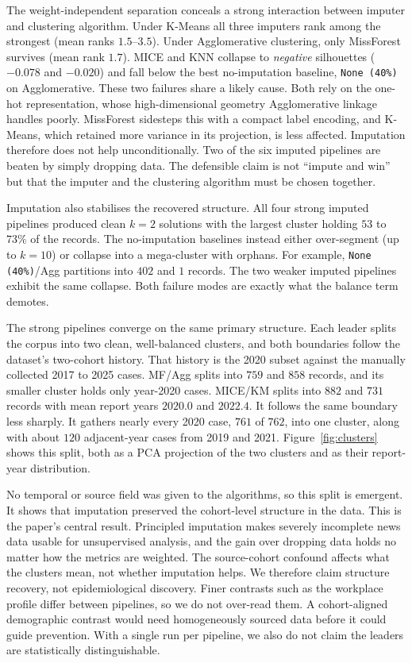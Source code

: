 \documentclass[conference]{IEEEtran}
\begin{document}
The weight-independent separation conceals a strong interaction between imputer and clustering algorithm. Under K-Means all three imputers rank among the strongest (mean ranks $1.5$--$3.5$). Under Agglomerative clustering, only MissForest survives (mean rank $1.7$). MICE and KNN collapse to \emph{negative} silhouettes ($-0.078$ and $-0.020$) and fall below the best no-imputation baseline, \texttt{None (40\%)} on Agglomerative. These two failures share a likely cause. Both rely on the one-hot representation, whose high-dimensional geometry Agglomerative linkage handles poorly. MissForest sidesteps this with a compact label encoding, and K-Means, which retained more variance in its projection, is less affected. Imputation therefore does not help unconditionally. Two of the six imputed pipelines are beaten by simply dropping data. The defensible claim is not ``impute and win'' but that the imputer and the clustering algorithm must be chosen together.

Imputation also stabilises the recovered structure. All four strong imputed pipelines produced clean $k{=}2$ solutions with the largest cluster holding $53$ to $73\%$ of the records. The no-imputation baselines instead either over-segment (up to $k{=}10$) or collapse into a mega-cluster with orphans. For example, \texttt{None (40\%)}/Agg partitions into $402$ and $1$ records. The two weaker imputed pipelines exhibit the same collapse. Both failure modes are exactly what the balance term demotes.

The strong pipelines converge on the same primary structure. Each leader splits the corpus into two clean, well-balanced clusters, and both boundaries follow the dataset's two-cohort history. That history is the 2020 subset against the manually collected 2017 to 2025 cases. MF/Agg splits into $759$ and $858$ records, and its smaller cluster holds only year-2020 cases. MICE/KM splits into $882$ and $731$ records with mean report years $2020.0$ and $2022.4$. It follows the same boundary less sharply. It gathers nearly every 2020 case, $761$ of $762$, into one cluster, along with about $120$ adjacent-year cases from 2019 and 2021. Figure~\ref{fig:clusters} shows this split, both as a PCA projection of the two clusters and as their report-year distribution.

No temporal or source field was given to the algorithms, so this split is emergent. It shows that imputation preserved the cohort-level structure in the data. This is the paper's central result. Principled imputation makes severely incomplete news data usable for unsupervised analysis, and the gain over dropping data holds no matter how the metrics are weighted. The source-cohort confound affects what the clusters mean, not whether imputation helps. We therefore claim structure recovery, not epidemiological discovery. Finer contrasts such as the workplace profile differ between pipelines, so we do not over-read them. A cohort-aligned demographic contrast would need homogeneously sourced data before it could guide prevention. With a single run per pipeline, we also do not claim the leaders are statistically distinguishable.
\end{document}

